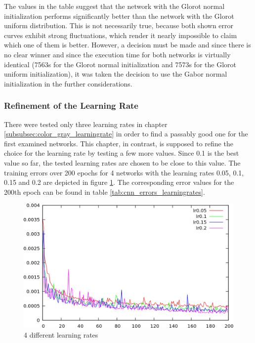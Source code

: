 \documentclass[11pt, a4paper]{article}
\begin{document}


The values in the table suggest that the network with the Glorot normal initialization performs significantly better than the network with the Glorot uniform distribution. This is not necessarily true, because both shown error curves exhibit strong fluctuations, which render it nearly impossible to claim which one of them is better. However, a decision must be made and since there is no clear winner and since the execution time for both networks is virtually identical (7563s for the Glorot normal initialization and 7573s for the Glorot uniform initialization), it was taken the decision to use the Gabor normal initialization in the further considerations.

\subsubsection{Refinement of the Learning Rate}

There were tested only three learning rates in chapter \ref{subsubsec:color_gray_learningrate} in order to find a passably good one for the first examined networks. This chapter, in contrast, is supposed to refine the choice for the learning rate by testing a few more values. Since 0.1 is the best value so far, the tested learning rates are chosen to be close to this value. The training errors over 200 epochs for 4 networks with the learning rates 0.05, 0.1, 0.15 and 0.2 are depicted in figure \ref{fig:cnn_learningrates}. The corresponding error values for the 200th epoch can be found in table \ref{tab:cnn_errors_learningrates}.\\

\vspace{-0.4cm}
\begin{figure}[h!]
	\centering
	\includegraphics[width=\textwidth]{results/cnn_learningrates.png}
	\caption{4 different learning rates}
	\label{fig:cnn_learningrates}
\end{figure}
\end{document}
